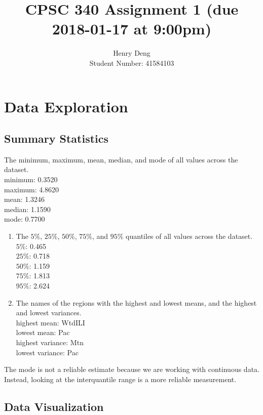 \documentclass{article}
\def\blu#1{{\color{blu}#1}}
\def\enum#1{\begin{enumerate}#1\end{enumerate}}
\begin{document}
\title{CPSC 340 Assignment 1 (due 2018-01-17 at 9:00pm)}
\author{Henry Deng \\ Student Number: 41584103}
\date{}
\maketitle

\vspace{-4em}

\section{Data Exploration}

\subsection{Summary Statistics}
The minimum, maximum, mean, median, and mode of all values across the dataset.
\\ \blu{minimum}: 0.3520
\\ \blu{maximum}: 4.8620
\\ \blu{mean}: 1.3246
\\ \blu{median}: 1.1590
\\ \blu{mode}: 0.7700
\enum{
\item The $5\%$, $25\%$, $50\%$, $75\%$, and $95\%$ quantiles of all values across the dataset.
\\ $5\%$: 0.465
\\ $25\%$: 0.718
\\ $50\%$: 1.159
\\ $75\%$: 1.813
\\ $95\%$: 2.624
\item The names of the regions with the highest and lowest means, and the highest and lowest variances.
\\ highest mean: WtdILI
\\ lowest mean: Pac 
\\ highest variance: Mtn 
\\ lowest variance: Pac 
}

The mode is not a reliable estimate because we are working with continuous data. Instead, looking at the interquantile range is a more reliable measurement.  

\subsection{Data Visualization}
\end{document}
